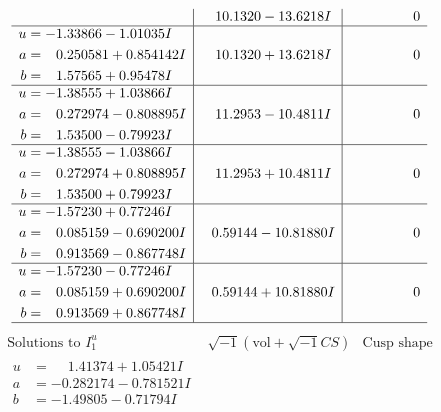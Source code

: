 \documentclass[1p]{elsarticle_modified}
\theoremstyle{definition}
\newcommand{\I}{\sqrt{-1}}
\begin{document}
$$\begin{array}{c|c|c}
 & \phantom{-}10.1320 - 13.6218 I & \phantom{-0.000000 } 0 \\ \hline\begin{aligned}
u &= -1.33866 - 1.01035 I \\
a &= \phantom{-}0.250581 + 0.854142 I \\
b &= \phantom{-}1.57565 + 0.95478 I\end{aligned}
 & \phantom{-}10.1320 + 13.6218 I & \phantom{-0.000000 } 0 \\ \hline\begin{aligned}
u &= -1.38555 + 1.03866 I \\
a &= \phantom{-}0.272974 - 0.808895 I \\
b &= \phantom{-}1.53500 - 0.79923 I\end{aligned}
 & \phantom{-}11.2953 - 10.4811 I & \phantom{-0.000000 } 0 \\ \hline\begin{aligned}
u &= -1.38555 - 1.03866 I \\
a &= \phantom{-}0.272974 + 0.808895 I \\
b &= \phantom{-}1.53500 + 0.79923 I\end{aligned}
 & \phantom{-}11.2953 + 10.4811 I & \phantom{-0.000000 } 0 \\ \hline\begin{aligned}
u &= -1.57230 + 0.77246 I \\
a &= \phantom{-}0.085159 - 0.690200 I \\
b &= \phantom{-}0.913569 - 0.867748 I\end{aligned}
 & \phantom{-}0.59144 - 10.81880 I & \phantom{-0.000000 } 0 \\ \hline\begin{aligned}
u &= -1.57230 - 0.77246 I \\
a &= \phantom{-}0.085159 + 0.690200 I \\
b &= \phantom{-}0.913569 + 0.867748 I\end{aligned}
 & \phantom{-}0.59144 + 10.81880 I & \phantom{-0.000000 } 0\\
 \hline 
 \end{array}$$\newpage$$\begin{array}{c|c|c}  
\text{Solutions to }I^u_{1}& \I (\text{vol} + \sqrt{-1}CS) & \text{Cusp shape}\\
 \hline 
\begin{aligned}
u &= \phantom{-}1.41374 + 1.05421 I \\
a &= -0.282174 - 0.781521 I \\
b &= -1.49805 - 0.71794 I\end{aligned}

\end{array}$$
\end{document}
